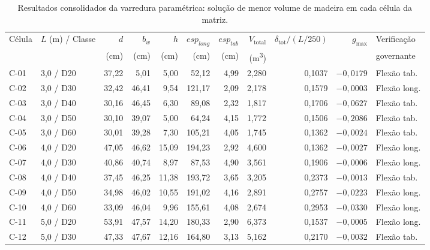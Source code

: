 \begin{table}[!ht]
\caption{Resultados consolidados da varredura paramétrica: solução de menor volume de madeira em cada célula da matriz.\label{tab:resultados_matriz}}
\begin{threeparttable}
\footnotesize
\setlength{\tabcolsep}{3pt}
\begin{tabular*}{\textwidth}{@{\extracolsep{\fill}}llrrrrrrrrl@{\extracolsep{\fill}}}
\toprule
Célula & $L$ (m) / Classe & $d$ & $b_w$ & $h$ & $esp_{long}$ & $esp_{tab}$ & $V_{\mathrm{total}}$ & $\delta_{\mathrm{tot}}/(L/250)$ & $g_{\max}$ & Verificação \\
 & & (cm) & (cm) & (cm) & (cm) & (cm) & (m\textsuperscript{3}) & & & governante \\
\midrule
C-01 & 3{,}0 / D20 & 37{,}22 & 5{,}01 & 5{,}00 & 52{,}12 & 4{,}99 & 2{,}280 & 0{,}1037 & $-0{,}0179$ & Flexão tab. \\
C-02 & 3{,}0 / D30 & 32{,}42 & 46{,}41 & 9{,}54 & 121{,}17 & 2{,}09 & 2{,}178 & 0{,}1579 & $-0{,}0003$ & Flexão long. \\
C-03 & 3{,}0 / D40 & 30{,}16 & 46{,}45 & 6{,}30 & 89{,}08 & 2{,}32 & 1{,}817 & 0{,}1706 & $-0{,}0627$ & Flexão tab. \\
C-04 & 3{,}0 / D50 & 30{,}10 & 39{,}07 & 5{,}00 & 64{,}24 & 4{,}15 & 1{,}772 & 0{,}1506 & $-0{,}2086$ & Flexão tab. \\
C-05 & 3{,}0 / D60 & 30{,}01 & 39{,}28 & 7{,}30 & 105{,}21 & 4{,}05 & 1{,}745 & 0{,}1362 & $-0{,}0024$ & Flexão tab. \\
\midrule
C-06 & 4{,}0 / D20 & 47{,}05 & 46{,}62 & 15{,}09 & 194{,}23 & 2{,}92 & 4{,}600 & 0{,}1362 & $-0{,}0027$ & Flexão long. \\
C-07 & 4{,}0 / D30 & 40{,}86 & 40{,}74 & 8{,}97 & 87{,}53 & 4{,}90 & 3{,}561 & 0{,}1906 & $-0{,}0006$ & Flexão long. \\
C-08 & 4{,}0 / D40 & 37{,}45 & 46{,}25 & 11{,}38 & 193{,}72 & 3{,}65 & 3{,}205 & 0{,}2373 & $-0{,}0013$ & Flexão tab. \\
C-09 & 4{,}0 / D50 & 34{,}98 & 46{,}02 & 10{,}55 & 191{,}02 & 4{,}16 & 2{,}891 & 0{,}2757 & $-0{,}0223$ & Flexão long. \\
C-10 & 4{,}0 / D60 & 33{,}09 & 46{,}04 & 9{,}96 & 155{,}61 & 4{,}08 & 2{,}674 & 0{,}2953 & $-0{,}0330$ & Flexão long. \\
\midrule
C-11 & 5{,}0 / D20 & 53{,}91 & 47{,}57 & 14{,}20 & 180{,}33 & 2{,}90 & 6{,}373 & 0{,}1537 & $-0{,}0005$ & Flexão long. \\
C-12 & 5{,}0 / D30 & 47{,}33 & 47{,}67 & 12{,}16 & 164{,}80 & 3{,}13 & 5{,}162 & 0{,}2170 & $-0{,}0032$ & Flexão tab. \\

\end{tabular*}
\end{threeparttable}
\end{table}

